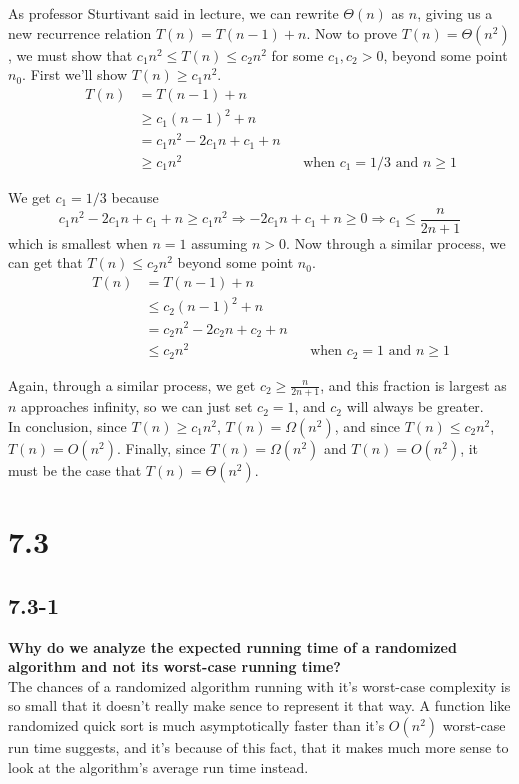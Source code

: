 \documentclass[11pt]{article}
\begin{document}
 As professor Sturtivant said in lecture, we can rewrite $\Theta (n)$ as $n$, giving us a new recurrence relation 
 $T(n) = T(n-1) + n$.  Now to prove $T(n) = \Theta (n^2)$, we must show that $c_1 n^2 \leq T(n) \leq c_2 n^2$ for 
 some $c_1, c_2 > 0$, beyond  some point $n_0$.  First we'll show $T(n) \geq c_1 n^2$. 
 \begin{align*}
   && T(n) &= T(n-1) + n && \\
   && &\geq c_1 (n-1)^2 + n && \\
   && &= c_1 n^2 -2c_1 n + c_1 + n && \\
   && &\geq c_1 n^2 && \text{when $c_1 = 1/3$ and $n \geq 1$}
 \end{align*}

 We get $c_1 = 1/3$ because 
 $$c_1 n^2 -2c_1 n + c_1 + n \geq c_1 n^2 \Rightarrow -2c_1 n + c_1 + n \geq 0 \Rightarrow 
 c_1 \leq \frac{n}{2n+1}$$
 which is smallest when $n = 1$ assuming $n > 0$.  Now through a similar process, we can get that 
 $T(n) \leq c_2 n^2$ beyond some point $n_0$.
 \begin{align*}
   && T(n) &= T(n-1) + n && \\
   && &\leq c_2 (n-1)^2 + n && \\
   && &= c_2 n^2 -2c_2 n + c_2 + n && \\
   && &\leq c_2 n^2 && \text{when $c_2 = 1$ and $n \geq 1$}
 \end{align*}

 Again, through a similar process, we get  $c_2 \geq \frac{n}{2n+1}$, and this fraction is largest as $n$ 
 approaches infinity, so we can just set $c_2 = 1$, and $c_2$ will always be greater. \\

 In conclusion, since $T(n) \geq c_1 n^2$, $T(n) = \Omega (n^2)$, and since $T(n) \leq c_2 n^2$, 
 $T(n) = O(n^2)$.  Finally, since $T(n) = \Omega (n^2)$ and $T(n) = O(n^2)$, it must be the case that 
 $T(n) = \Theta (n^2)$.

 \newpage
 \section*{7.3} 

 \subsection*{7.3-1}
 \textbf{Why do we analyze the expected running time of a randomized algorithm and not its worst-case 
 running time?} \\

 The chances of a randomized algorithm running with it's worst-case complexity is so small that it doesn't really make 
 sence to represent it that way.  A function like randomized quick sort is much asymptotically 
 faster than it's $O(n^2)$ worst-case run time suggests, and it's because of this fact, that it makes much 
 more sense to look at the algorithm's average run time instead.
\end{document}
